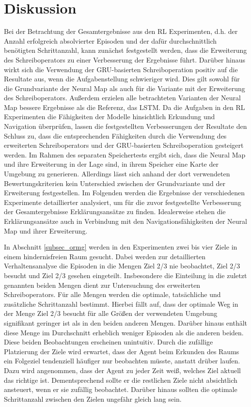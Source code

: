 \chapter{Diskussion}
\label{chap_disc}


Bei der Betrachtung der Gesamtergebnisse aus den RL Experimenten, d.h. der Anzahl erfolgreich absolvierter Episoden und der dafür durchschnittlich benötigten Schrittanzahl, kann zunächst festgestellt werden, dass die Erweiterung des Schreiboperators zu einer Verbesserung der Ergebnisse führt. Darüber hinaus wirkt sich die Verwendung der GRU-basierten Schreiboperation positiv auf die Resultate aus, wenn die Aufgabenstellung schwieriger wird. Dies gilt sowohl für die Grundvariante der Neural Map als auch für die Variante mit der Erweiterung des Schreiboperators. Außerdem erzielen alle betrachteten Varianten der Neural Map bessere Ergebnisse als die Referenz, das LSTM. Da die Aufgaben in den RL Experimenten die Fähigkeiten der Modelle hinsichtlich Erkundung und Navigation überprüfen, lassen die festgestellten Verbesserungen der Resultate den Schluss zu, dass die entsprechenden Fähigkeiten durch die Verwendung des erweiterten Schreiboperators und der GRU-basierten Schreiboperation gesteigert werden. Im Rahmen des separaten Speichertests ergibt sich, dass die Neural Map und ihre Erweiterung in der Lage sind, in ihrem Speicher eine Karte der Umgebung zu generieren. Allerdings lässt sich anhand der dort verwendeten Bewertungskriterien kein Unterschied zwischen der Grundvariante und der Erweiterung festgestellen. Im Folgenden werden die Ergebnisse der verschiedenen Experimente detaillierter analysiert, um für die zuvor festgestellte Verbesserung der Gesamtergebnisse Erklärungsansätze zu finden. Idealerweise stehen die Erklärungsansätze auch in Verbindung mit den Navigationsfähigkeiten der Neural Map und ihrer Erweiterung.

In Abschnitt \ref{subsec_ormg} werden in den Experimenten zwei bis vier Ziele in einem hindernisfreien Raum gesucht. Dabei werden zur detaillierten Verhaltensanalyse die Episoden in die Mengen \glqq Ziel 2/3 nie beobachtet\grqq{}, \glqq Ziel 2/3 besucht\grqq{} und \glqq Ziel 2/3 gesehen\grqq{} eingeteilt. Insbesondere die Einteilung in die zuletzt genannten beiden Mengen dient zur Untersuchung des erweiterten Schreiboperators. Für alle Mengen werden die optimale, tatsächliche und zusätzliche Schrittanzahl bestimmt. Hierbei fällt auf, dass der optimale Weg in der Menge \glqq Ziel 2/3 besucht\grqq{} für alle Größen der verwendeten Umgebung signifikant geringer ist als in den beiden anderen Mengen. Darüber hinaus enthält diese Menge im Durchschnitt erheblich weniger Episoden als die anderen beiden. Diese beiden Beobachtungen erscheinen unintuitiv. Durch die zufällige Platzierung der Ziele wird erwartet, dass der Agent beim Erkunden des Raums ein Folgeziel tendenziell häufiger nur beobachten müsste, anstatt drüber laufen. Dazu wird angenommen, dass der Agent zu jeder Zeit weiß, welches Ziel aktuell das richtige ist. Dementsprechend sollte er die restlichen Ziele nicht absichtlich ansteuert, wenn er sie zufällig beobachtet. Darüber hinaus sollten die optimale Schrittanzahl zwischen den Zielen ungefähr gleich lang sein.


